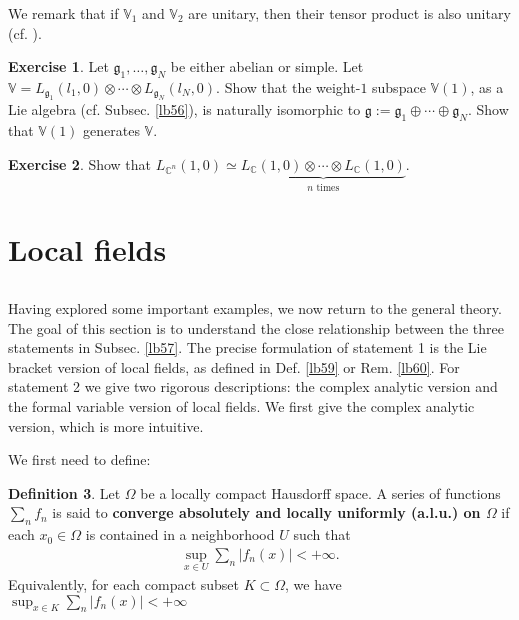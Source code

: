 \documentclass[11pt,b5paper,notitlepage]{article}
\theoremstyle{definition}
\newtheorem{df}{Definition}[section]
\newtheorem{exe}[df]{Exercise}
\theoremstyle{plain}
\newcommand{\gk}{\mathfrak g}
\newcommand{\Vbb}{\mathbb V}
\newcommand{\Cbb}{\mathbb C}
\numberwithin{equation}{section}
\begin{document}
We remark that if $\Vbb_1$ and $\Vbb_2$ are unitary, then their tensor product is also unitary (cf. \cite{DL14,CKLW18}).

\begin{exe}
Let $\gk_1,\dots,\gk_N$ be either abelian or simple. Let $\Vbb=L_{\gk_1}(l_1,0)\otimes\cdots\otimes L_{\gk_N}(l_N,0)$. Show that the weight-$1$ subspace $\Vbb(1)$, as a Lie algebra (cf. Subsec. \ref{lb56}), is naturally isomorphic to $\gk:=\gk_1\oplus\cdots\oplus\gk_N$. Show that $\Vbb(1)$ generates $\Vbb$.
\end{exe}

\begin{exe}
Show that $L_{\Cbb^n}(1,0)\simeq\underbrace{L_\Cbb(1,0)\otimes\cdots\otimes L_\Cbb(1,0)}_{n\text{ times}}$.
\end{exe}



\section{Local fields}\label{lb83}

\subsection{}

Having explored some important examples, we now return to the general theory. The goal of this section is to understand the close relationship between the three statements in Subsec. \ref{lb57}. The precise formulation of statement 1 is the Lie bracket version of local fields, as defined in Def. \ref{lb59} or Rem. \ref{lb60}. For statement 2 we give two rigorous descriptions: the complex analytic version and the formal variable version of local fields. We first give the complex analytic version, which is more intuitive. 

We first need to define:

\begin{df}
Let $\Omega$ be a locally compact Hausdorff space. A  series of functions $\sum_n f_n$ is said to \textbf{converge absolutely and locally uniformly (a.l.u.)  on $\Omega$} if  each $x_0\in\Omega$ is contained in a neighborhood $U$ such that
\begin{align*}
\sup_{x\in U}\sum_n|f_n(x)|<+\infty.	
\end{align*}
Equivalently, for each compact subset $K\subset \Omega$, we have $\sup_{x\in K}\sum_n|f_n(x)|<+\infty$
\end{df}
\end{document}
